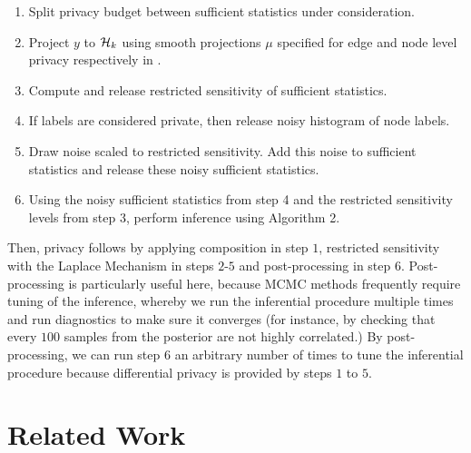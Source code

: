 \begin{enumerate}
	\item Split privacy budget between sufficient statistics under consideration.
	\item Project $y$ to $\mathcal{H}_k$ using smooth projections $\mu$ specified for edge and node level privacy respectively in .
	\item Compute and release restricted sensitivity of sufficient statistics.
	\item If labels are considered private, then release noisy histogram of node labels.
	\item Draw noise scaled to restricted sensitivity. Add this noise to sufficient statistics and release these noisy sufficient statistics.
	\item Using the noisy sufficient statistics from step 4 and the restricted sensitivity levels from step 3, perform inference using Algorithm 2. 
\end{enumerate}

Then, privacy follows by applying composition in step $1$, restricted sensitivity with the Laplace Mechanism in steps $2$-$5$ and post-processing in step $6$. Post-processing is particularly useful here, because MCMC methods frequently require tuning of the inference, whereby we run the inferential procedure multiple times and run diagnostics to make sure it converges (for instance, by checking that every $100$ samples from the posterior are not highly correlated.) By post-processing, we can run step $6$ an arbitrary number of times to tune the inferential procedure because differential privacy is provided by steps $1$ to $5$.

\section{Related Work}\label{sec:rel_work}

